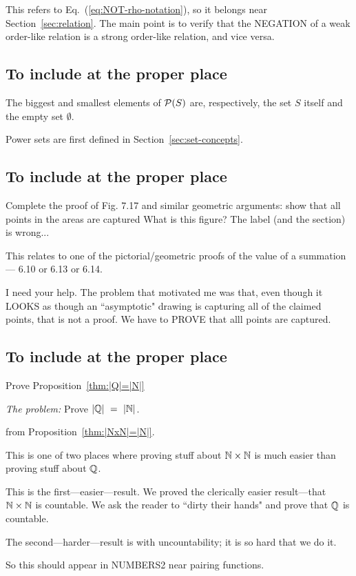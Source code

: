 {\Arny This refers to Eq.~(\ref{eq:NOT-rho-notation}), so it belongs near Section~\ref{sec:relation}.  The main point is to verify that the NEGATION of a weak order-like relation is a strong order-like relation, and vice versa.}
 
\subsection{To include at the proper place}

 The biggest and smallest elements of
${\cal P}(S)$ are, respectively, the set $S$ itself and the empty set
$\emptyset$.

{\Arny Power sets are first defined in Section~\ref{sec:set-concepts}.}

\subsection{To include at the proper place}

Complete the proof of Fig. 7.17 and similar geometric arguments: show
that all points in the areas are captured
{\Denis What is this figure? The label (and the section) is wrong... }

{\Arny   This relates to one of the pictorial/geometric proofs of the value of a summation ---
6.10 or 6.13 or 6.14.

I need your help.  The problem that motivated me was that, even though it LOOKS as though an ``asymptotic" drawing is capturing all of the claimed points, that is not a proof.  We have to PROVE that alll points are captured.}



\subsection{To include at the proper place}

Prove Proposition~\ref{thm:|Q|=|N|}

\noindent \textit{The problem:}
Prove $|\Q| \ = \ |\N|$.
\medskip

from Proposition~\ref{thm:|NxN|=|N|}.

{\Arny This is one of two places where proving stuff about $\mathbb{N} \times \mathbb{N}$ is much easier than proving stuff about $\mathbb{Q}$.

This is the first---easier---result.  We proved the clerically easier result---that $\mathbb{N} \times \mathbb{N}$ is countable.  We ask the reader to ``dirty their hands" and prove that $\mathbb{Q}$ is countable.

The second---harder---result is with uncountability; it is so hard that we do it.

So this should appear in NUMBERS2 near pairing functions.}



